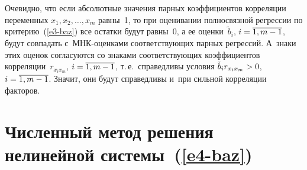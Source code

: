 \begin{multicols}{2}
  Очевидно, что если абсолютные значения парных коэффициентов корреляции 
переменных $x_1, x_2,\ldots , x_m$ равны~1, то при оценивании полносвязной 
регрессии по критерию~(\ref{e3-baz}) все остатки будут равны~0, а ее 
оценки~$\tilde{b}_i$, $i\hm=\overline{1,m-1}$, будут совпадать  
с~МНК-оцен\-ка\-ми соответствующих парных регрессий. А~знаки этих оценок 
согласуются со знаками соответствующих коэффициентов 
корреляции~$r_{x_ix_m}$, $i\hm=\overline{1,m-1}$, т.\,е.\ справедливы условия 
$\tilde{b}_i r_{x_ix_m}\hm>0$, $i\hm=\overline{1,m-1}$. Значит, они будут справедливы и~при сильной 
корреляции факторов.

\section{Численный метод решения нелинейной  
системы~(\ref{e4-baz})}


\end{multicols}

